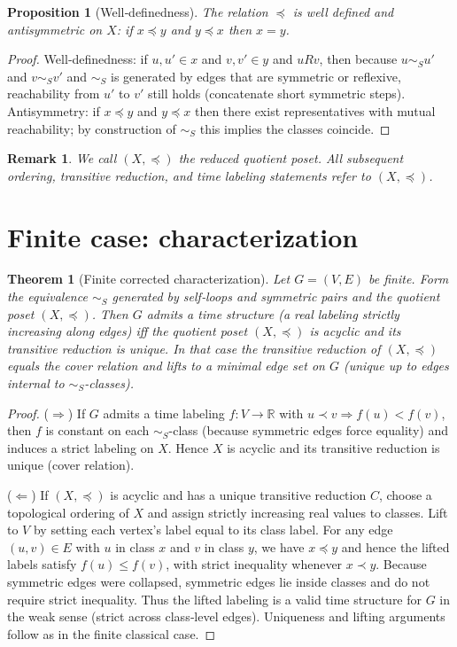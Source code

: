 \documentclass[11pt]{article}
\newtheorem{theorem}[definition]{Theorem}
\newtheorem{proposition}[definition]{Proposition}
\newtheorem{remark}[definition]{Remark}
\begin{document}
\begin{proposition}[Well‑definedness]
The relation \(\preceq\) is well defined and antisymmetric on \(X\):
if \(x\preceq y\) and \(y\preceq x\) then \(x=y\).
\end{proposition}

\begin{proof}
Well‑definedness: if \(u,u'\in x\) and \(v,v'\in y\) and \(uR v\), then
because \(u\sim_S u'\) and \(v\sim_S v'\) and \(\sim_S\) is generated by
edges that are symmetric or reflexive, reachability from \(u'\) to \(v'\)
still holds (concatenate short symmetric steps). Antisymmetry: if
\(x\preceq y\) and \(y\preceq x\) then there exist representatives with
mutual reachability; by construction of \(\sim_S\) this implies the
classes coincide.
\end{proof}

\begin{remark}
We call \((X,\preceq)\) the \emph{reduced quotient poset}. All subsequent
ordering, transitive reduction, and time labeling statements refer to
\((X,\preceq)\).
\end{remark}

\section{Finite case: characterization}\label{sec:finite}
\begin{theorem}[Finite corrected characterization]
Let \(G=(V,E)\) be finite. Form the equivalence \(\sim_S\) generated by
self‑loops and symmetric pairs and the quotient poset \((X,\preceq)\).
Then \(G\) admits a time structure (a real labeling strictly increasing
along edges) iff the quotient poset \((X,\preceq)\) is acyclic and its
transitive reduction is unique. In that case the transitive reduction of
\((X,\preceq)\) equals the cover relation and lifts to a minimal edge set
on \(G\) (unique up to edges internal to \(\sim_S\)-classes).
\end{theorem}

\begin{proof}
(\(\Rightarrow\)) If \(G\) admits a time labeling \(f:V\to\mathbb R\)
with \(u\prec v\Rightarrow f(u)<f(v)\), then \(f\) is constant on each
\(\sim_S\)-class (because symmetric edges force equality) and induces a
strict labeling on \(X\). Hence \(X\) is acyclic and its transitive
reduction is unique (cover relation).

(\(\Leftarrow\)) If \((X,\preceq)\) is acyclic and has a unique
transitive reduction \(C\), choose a topological ordering of \(X\) and
assign strictly increasing real values to classes. Lift to \(V\) by
setting each vertex's label equal to its class label. For any edge
\((u,v)\in E\) with \(u\) in class \(x\) and \(v\) in class \(y\), we
have \(x\preceq y\) and hence the lifted labels satisfy \(f(u)\le f(v)\),
with strict inequality whenever \(x\prec y\). Because symmetric edges
were collapsed, symmetric edges lie inside classes and do not
require strict inequality. Thus the lifted labeling is a valid time
structure for \(G\) in the weak sense (strict across class‑level edges).
Uniqueness and lifting arguments follow as in the finite classical case.
\end{proof}
\end{document}
